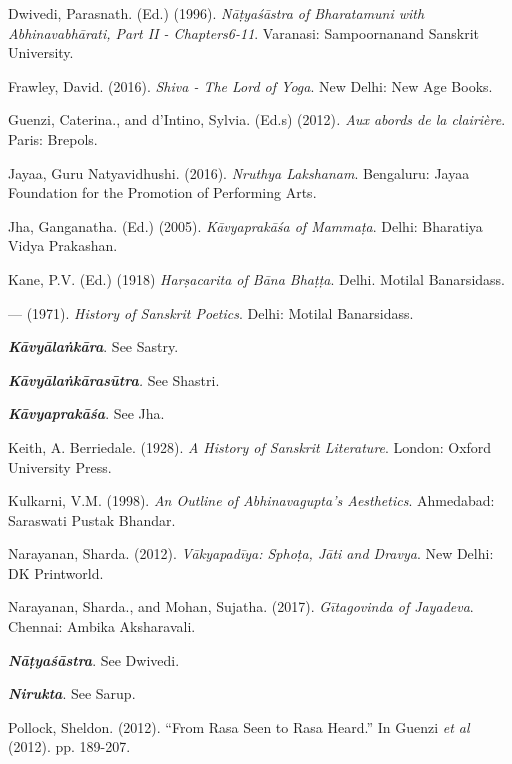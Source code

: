 \begin{thebibliography}{99}
\itemsep=0pt
 Dwivedi, Parasnath. (Ed.) (1996). \textit{Nāṭyaśāstra of Bharatamuni with Abhinavabhārati, Part II - Chapters6-11}. Varanasi: Sampoornanand Sanskrit University.

  Frawley, David. (2016). \textit{Shiva - The Lord of Yoga}. New Delhi: New Age Books.

  Guenzi, Caterina., and d’Intino, Sylvia. (Ed.s) (2012)\textit{. Aux abords de la clairière}. Paris: Brepols.

  Jayaa, Guru Natyavidhushi. (2016). \textit{Nruthya Lakshanam}. Bengaluru: Jayaa Foundation for the Promotion of Performing Arts.

  Jha, Ganganatha. (Ed.) (2005). \textit{Kāvyaprakāśa of Mammaṭa}. Delhi: Bharatiya Vidya Prakashan.

  Kane, P.V. (Ed.) (1918) \textit{Harṣacarita of Bāna Bhaṭṭa}. Delhi. Motilal Banarsidass.

  — (1971). \textit{History of Sanskrit Poetics}. Delhi: Motilal Banarsidass.

  \textit{\textbf{Kāvyālaṅkāra}}. See Sastry.

  \textit{\textbf{Kāvyālaṅkārasūtra}. }See Shastri.

  \textit{\textbf{Kāvyaprakāśa}}. See Jha.

  Keith, A. Berriedale. (1928). \textit{A History of Sanskrit Literature}. London: Oxford University Press.

  Kulkarni, V.M. (1998). \textit{An Outline of Abhinavagupta’s Aesthetics}. Ahmedabad: Saraswati Pustak Bhandar.

  Narayanan, Sharda. (2012). \textit{Vākyapadīya: Sphoṭa, Jāti and Dravya}. New Delhi: DK Printworld.

  Narayanan, Sharda., and Mohan, Sujatha. (2017).\textit{ Gītagovinda of Jayadeva}. Chennai: Ambika Aksharavali.

  \textit{\textbf{Nāṭyaśāstra}}. See Dwivedi.

  \textit{\textbf{Nirukta}}. See Sarup.

  Pollock, Sheldon. (2012). “From Rasa Seen to Rasa Heard.” In Guenzi \textit{et al} (2012). pp. 189-207.


\end{thebibliography}
